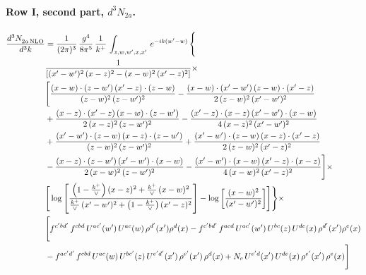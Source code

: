 \documentclass[10pt]{article}
\numberwithin{equation}{section}
\begin{document}
\paragraph{Row I, second part, $d^3N_{2a}$.}
\begin{align}
    \frac{d^{3}N_{2a\,\rm NLO}^{\rm}}{d^{3}k}  & =  \frac{1}{(2\pi)^{3}}\, \frac{g^{4}}{8\pi^{5}}\,\frac{1}{k^{+}}\,\int_{z,w,w^{\prime},x,x'}\, e^{-ik(w^{\prime}-w)}\, \Bigg\{\notag \\
& \frac{1}{\left[(x'-w')^{2}\, (x-z)^{2}-(x-w)^{2}\, (x'-z)^{2}\right]}\times\,\notag \\ & \Bigg[\frac{(x-w)\cdot (z-w')\, (x'-z)\cdot (z-w)}{(z-w)^{2}\,(z-w')^{2}}-\frac{(x-w)\cdot (x'-w')\, (z-w)\cdot (x'-z)}{2\, (z-w)^{2}\, (x'-w')^{2}}\notag \\ & + \frac{(x-z)\cdot (x'-z)\, (x-w)\cdot (z-w')}{2\, (x-z)^{2}\, (z-w')^{2}}-\frac{(x'-z)\cdot (x-z)\, (x'-w')\cdot (x-w)}{4\, (x-z)^{2}\, (x'-w')^{2}}\notag \\ & + \frac{(x'-w')\cdot (z-w)\, (x-z)\cdot (z-w')}{(z-w)^{2}\,(z-w')^{2}}+\frac{(x'-w')\cdot (z-w)\, (x-z)\cdot (x'-z)}{2\, (z-w)^{2}\, (x'-z)^{2}}\notag \\ & - \frac{(x-z)\cdot (z-w')\, (x'-w')\cdot (x-w)}{2\, (x-w)^{2}\, (z-w')^{2}} -\frac{(x'-w')\cdot (x-w)\, (x'-z)\cdot (x-z)}{4\, (x-w)^{2}\, (x'-z)^{2}}\Bigg]\times\notag \\ &  \Bigg[\log{\left[\frac{\left(1-\frac{k^{+}}{\vee}\right)(x-z)^{2}+\frac{k^{+}}{\vee}\,(x-w)^{2}}{\frac{k^{+}}{\vee}\, (x'-w')^{2} + \left(1-\frac{k^{+}}{\vee}\right) (x'-z)^{2}}\right]}-\log{\left[\frac{(x-w)^{2}}{(x'-w')^{2}}\right]}\Bigg]\Bigg\} \times\, \notag \\ & \Bigg[f^{c'bd'}\,f^{cbd}\, U^{ac'}(w')\,U^{ac}(w)\,\rho^{d'}(x')\rho^{d}(x)- f^{c'bd'}\,f^{acd}\,U^{ac'}(w')\,U^{bc}(z)\,U^{de}(x)\,\rho^{d'}(x')\rho^{e}(x) \notag \\ & -f^{ac'd'}\,f^{cbd}\,U^{ac}(w)\,U^{bc'}(z)\,U^{e'd'}(x')\,\rho^{e'}(x')\,\rho^{d}(x) +N_{c}\,U^{e'd}(x')\,U^{de}(x)\,\rho^{e'}(x')\,\rho^{e}(x)\Bigg] \label{eq:F:G2I2a}
\end{align}
\end{document}
